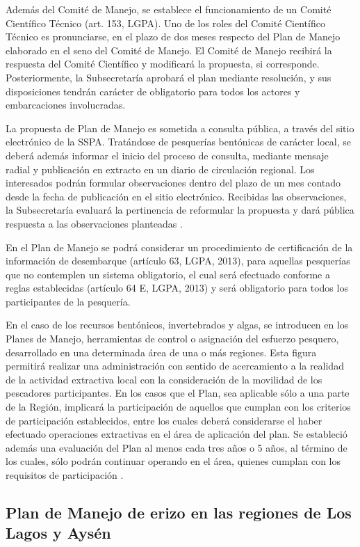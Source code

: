 \documentclass[
]{article}
\begin{document}
Además del Comité de Manejo, se establece el funcionamiento de un Comité
Científico Técnico (art. 153, LGPA). Uno de los roles del Comité
Científico Técnico es pronunciarse, en el plazo de dos meses respecto
del Plan de Manejo elaborado en el seno del Comité de Manejo. El Comité
de Manejo recibirá la respuesta del Comité Científico y modificará la
propuesta, si corresponde. Posteriormente, la Subsecretaría aprobará el
plan mediante resolución, y sus disposiciones tendrán carácter de
obligatorio para todos los actores y embarcaciones involucradas.

La propuesta de Plan de Manejo es sometida a consulta pública, a través
del sitio electrónico de la SSPA. Tratándose de pesquerías bentónicas de
carácter local, se deberá además informar el inicio del proceso de
consulta, mediante mensaje radial y publicación en extracto en un diario
de circulación regional. Los interesados podrán formular observaciones
dentro del plazo de un mes contado desde la fecha de publicación en el
sitio electrónico. Recibidas las observaciones, la Subsecretaría
evaluará la pertinencia de reformular la propuesta y dará pública
respuesta a las observaciones planteadas .

En el Plan de Manejo se podrá considerar un procedimiento de
certificación de la información de desembarque (artículo 63, LGPA,
2013), para aquellas pesquerías que no contemplen un sistema
obligatorio, el cual será efectuado conforme a reglas establecidas
(artículo 64 E, LGPA, 2013) y será obligatorio para todos los
participantes de la pesquería.

En el caso de los recursos bentónicos, invertebrados y algas, se
introducen en los Planes de Manejo, herramientas de control o asignación
del esfuerzo pesquero, desarrollado en una determinada área de una o más
regiones. Esta figura permitirá realizar una administración con sentido
de acercamiento a la realidad de la actividad extractiva local con la
consideración de la movilidad de los pescadores participantes. En los
casos que el Plan, sea aplicable sólo a una parte de la Región,
implicará la participación de aquellos que cumplan con los criterios de
participación establecidos, entre los cuales deberá considerarse el
haber efectuado operaciones extractivas en el área de aplicación del
plan. Se estableció además una evaluación del Plan al menos cada tres
años o 5 años, al término de los cuales, sólo podrán continuar operando
en el área, quienes cumplan con los requisitos de participación .

\hypertarget{plan-de-manejo-de-erizo-en-las-regiones-de-los-lagos-y-aysuxe9n}{%
\subsection{Plan de Manejo de erizo en las regiones de Los Lagos y
Aysén}\label{plan-de-manejo-de-erizo-en-las-regiones-de-los-lagos-y-aysuxe9n}}
\end{document}
